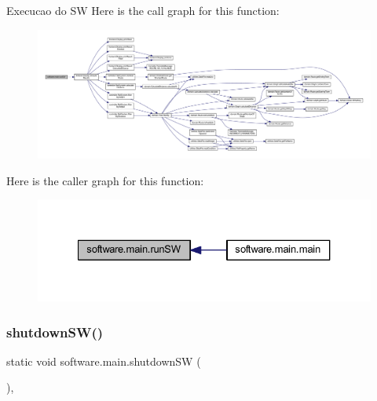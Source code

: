 Execucao do SW Here is the call graph for this function\+:\nopagebreak
\begin{figure}[H]
\begin{center}
\leavevmode
\includegraphics[width=350pt]{classsoftware_1_1main_a20702c213493bc103f21bea8d159f810_cgraph}
\end{center}
\end{figure}
Here is the caller graph for this function\+:\nopagebreak
\begin{figure}[H]
\begin{center}
\leavevmode
\includegraphics[width=327pt]{classsoftware_1_1main_a20702c213493bc103f21bea8d159f810_icgraph}
\end{center}
\end{figure}
\mbox{\label{classsoftware_1_1main_a7ae92a61ad38d1c4bd6ba6be3ff49fa0}} 
\subsubsection{\texorpdfstring{shutdown\+S\+W()}{shutdownSW()}}
{\footnotesize\ttfamily static void software.\+main.\+shutdown\+SW (\begin{DoxyParamCaption}{ }\end{DoxyParamCaption})\hspace{0.3cm}{\ttfamily [static]}, {\ttfamily [package]}}

